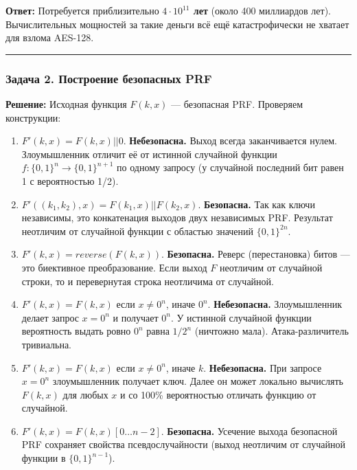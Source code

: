 \textbf{Ответ:} Потребуется приблизительно \textbf{\(4 \cdot 10^{11}\) лет} (около 400 миллиардов лет). Вычислительных мощностей за такие деньги всё ещё катастрофически не хватает для взлома AES-128.

\begin{center}\rule{0.5\linewidth}{0.5pt}\end{center}

\subsubsection{Задача 2. Построение безопасных PRF}\label{ux437ux430ux434ux430ux447ux430-2.-ux43fux43eux441ux442ux440ux43eux435ux43dux438ux435-ux431ux435ux437ux43eux43fux430ux441ux43dux44bux445-prf}

\textbf{Решение:} Исходная функция \(F(k, x)\) --- безопасная PRF. Проверяем конструкции:

\begin{enumerate}
\def\labelenumi{\arabic{enumi}.}
\tightlist
\item
  \(F'(k, x) = F(k, x) || 0\). \textbf{Небезопасна.} Выход всегда заканчивается нулем. Злоумышленник отличит её от истинной случайной функции \(f: \{0,1\}^n \to \{0,1\}^{n+1}\) по одному запросу (у случайной последний бит равен 1 с вероятностью 1/2).
\item
  \(F'((k_1, k_2), x) = F(k_1, x) || F(k_2, x)\). \textbf{Безопасна.} Так как ключи независимы, это конкатенация выходов двух независимых PRF. Результат неотличим от случайной функции с областью значений \(\{0,1\}^{2n}\).
\item
  \(F'(k, x) = reverse(F(k, x))\). \textbf{Безопасна.} Реверс (перестановка) битов --- это биективное преобразование. Если выход \(F\) неотличим от случайной строки, то и перевернутая строка неотличима от случайной.
\item
  \(F'(k, x) = F(k, x)\) если \(x \neq 0^n\), иначе \(0^n\). \textbf{Небезопасна.} Злоумышленник делает запрос \(x = 0^n\) и получает \(0^n\). У истинной случайной функции вероятность выдать ровно \(0^n\) равна \(1/2^n\) (ничтожно мала). Атака-различитель тривиальна.
\item
  \(F'(k, x) = F(k, x)\) если \(x \neq 0^n\), иначе \(k\). \textbf{Небезопасна.} При запросе \(x = 0^n\) злоумышленник получает ключ. Далее он может локально вычислять \(F(k, x)\) для любых \(x\) и со 100\% вероятностью отличать функцию от случайной.
\item
  \(F'(k, x) = F(k, x)[0 \dots n-2]\). \textbf{Безопасна.} Усечение выхода безопасной PRF сохраняет свойства псевдослучайности (выход неотличим от случайной функции в \(\{0,1\}^{n-1}\)).
\end{enumerate}

